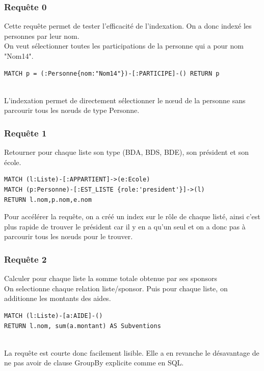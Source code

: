 \documentclass[a4paper,oneside,1pt]{article}
\begin{document}
\subsubsection{Requête 0}
Cette requête permet de tester l'efficacité de l'indexation. On a donc indexé les personnes par leur nom.
\\
On veut sélectionner toutes les participations de la personne qui a pour nom "Nom14". 
\\
\begin{verbatim}
MATCH p = (:Personne{nom:"Nom14"})-[:PARTICIPE]-() RETURN p
\end{verbatim}
\\L'indexation permet de directement sélectionner le nœud de la personne sans parcourir tous les nœuds de type Personne.

\subsubsection{Requête 1}
Retourner pour chaque liste son type (BDA, BDS, BDE), son président et son école.
\\
\begin{verbatim}
MATCH (l:Liste)-[:APPARTIENT]->(e:Ecole)
MATCH (p:Personne)-[:EST_LISTE {role:'president'}]->(l)
RETURN l.nom,p.nom,e.nom
\end{verbatim}

Pour accélérer la requête, on a créé un index sur le rôle de chaque listé, ainsi c'est plus rapide de trouver le président car il y en a qu'un seul et on a donc pas à parcourir tous les nœuds pour le trouver.


\subsubsection{Requête 2}
Calculer pour chaque liste la somme totale obtenue par ses sponsors
\\
On selectionne chaque relation liste/sponsor. Puis pour chaque liste, on additionne les montants des aides.
\\
\begin{verbatim}
MATCH (l:Liste)-[a:AIDE]-() 
RETURN l.nom, sum(a.montant) AS Subventions
\end{verbatim}
\\
La requête est courte donc facilement lisible. Elle a en revanche le désavantage de ne pas avoir de clause GroupBy explicite comme en SQL.
\end{document}
